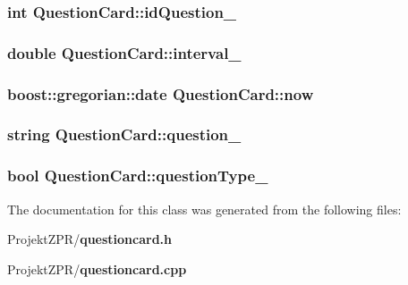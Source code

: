 \subsubsection[{id\-Question\-\_\-}]{\setlength{\rightskip}{0pt plus 5cm}int Question\-Card\-::id\-Question\-\_\-}\label{class_question_card_ab32d3e335f623af9c6c86171256b7d0d}
\subsubsection[{interval\-\_\-}]{\setlength{\rightskip}{0pt plus 5cm}double Question\-Card\-::interval\-\_\-}\label{class_question_card_aee718e8899e927a91569d631684f99ab}
\subsubsection[{now}]{\setlength{\rightskip}{0pt plus 5cm}boost\-::gregorian\-::date Question\-Card\-::now}\label{class_question_card_a22494150564aeaa69065c41098d5b18c}
\subsubsection[{question\-\_\-}]{\setlength{\rightskip}{0pt plus 5cm}string Question\-Card\-::question\-\_\-}\label{class_question_card_a5f6f13c809aab6dd8c1e66bd95011d2d}
\subsubsection[{question\-Type\-\_\-}]{\setlength{\rightskip}{0pt plus 5cm}bool Question\-Card\-::question\-Type\-\_\-}\label{class_question_card_a726e564badbacebe030cc8fa849bb43c}


The documentation for this class was generated from the following files\-:\begin{DoxyCompactItemize}
\item 
Projekt\-Z\-P\-R/{\bf questioncard.\-h}\item 
Projekt\-Z\-P\-R/{\bf questioncard.\-cpp}\end{DoxyCompactItemize}
